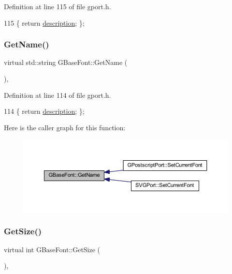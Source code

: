 Definition at line 115 of file gport.\+h.


\begin{DoxyCode}
115 \{ \textcolor{keywordflow}{return} \mbox{\hyperlink{class_g_base_font_a81dc0a7c8b42df0a39e49cc304da7d06}{description}}; \};
\end{DoxyCode}
\mbox{\label{class_g_base_font_a202a60eadc6436354527de8ccd4a983d}} 
\subsubsection{\texorpdfstring{Get\+Name()}{GetName()}}
{\footnotesize\ttfamily virtual std\+::string G\+Base\+Font\+::\+Get\+Name (\begin{DoxyParamCaption}{ }\end{DoxyParamCaption})\hspace{0.3cm}{\ttfamily [inline]}, {\ttfamily [virtual]}}



Definition at line 114 of file gport.\+h.


\begin{DoxyCode}
114 \{ \textcolor{keywordflow}{return} \mbox{\hyperlink{class_g_base_font_a81dc0a7c8b42df0a39e49cc304da7d06}{description}}; \};
\end{DoxyCode}
Here is the caller graph for this function\+:\nopagebreak
\begin{figure}[H]
\begin{center}
\leavevmode
\includegraphics[width=350pt]{class_g_base_font_a202a60eadc6436354527de8ccd4a983d_icgraph}
\end{center}
\end{figure}
\mbox{\label{class_g_base_font_a62e761a8a0c0f60f01d8a0d451640e69}} 
\subsubsection{\texorpdfstring{Get\+Size()}{GetSize()}}
{\footnotesize\ttfamily virtual int G\+Base\+Font\+::\+Get\+Size (\begin{DoxyParamCaption}{ }\end{DoxyParamCaption})\hspace{0.3cm}{\ttfamily [inline]}, {\ttfamily [virtual]}}



